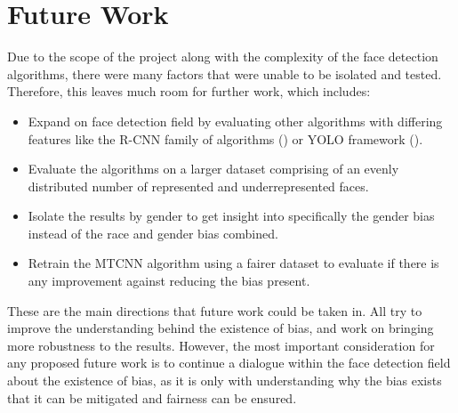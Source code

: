 \documentclass{l4proj}
\begin{document}
\section{Future Work}
Due to the scope of the project along with the complexity of the face detection algorithms, there were many factors that were unable to be isolated and tested. Therefore, this leaves much room for further work, which includes:
\begin{itemize}
  \item Expand on face detection field by evaluating other algorithms with differing features like the R-CNN family of algorithms (\cite{rcnn}) or YOLO framework (\cite{yolo}). 
  \item Evaluate the algorithms on a larger dataset comprising of an evenly distributed number of represented and underrepresented faces.
  \item Isolate the results by gender to get insight into specifically the gender bias instead of the race and gender bias combined.
  \item Retrain the MTCNN algorithm using a fairer dataset to evaluate if there is any improvement against reducing the bias present.
\end{itemize}
These are the main directions that future work could be taken in. All try to improve the understanding behind the existence of bias, and work on bringing more robustness to the results. However, the most important consideration for any proposed future work is to continue a dialogue within the face detection field about the existence of bias, as it is only with understanding why the bias exists that it can be mitigated and fairness can be ensured.





\end{document}
